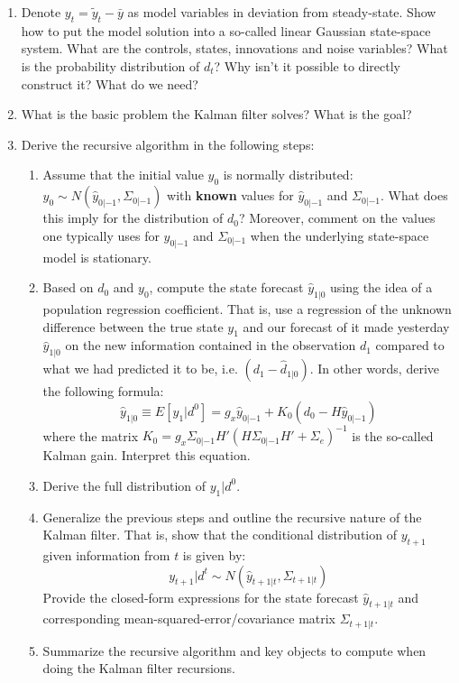 \begin{enumerate}
	\item Denote $y_t = \tilde{y}_t - \bar{y}$ as model variables in deviation from steady-state. Show how to put the model solution into a so-called linear Gaussian state-space system. What are the controls, states, innovations and noise variables? What is the probability distribution of $d_t$? Why isn't it possible to directly construct it? What do we need?
	\item What is the basic problem the Kalman filter solves? What is the goal?
	\item Derive the recursive algorithm in the following steps:
	\begin{enumerate}
		\item Assume that the initial value $y_0$ is normally distributed: $y_0 \sim N(\hat{y}_{0|-1},\Sigma_{0|-1})$ with \textbf{known} values for $\hat{y}_{0|-1}$ and $\Sigma_{0|-1}$. What does this imply for the distribution of $d_0$? Moreover, comment on the values one typically uses for $\hat{y}_{0|-1}$ and $\Sigma_{0|-1}$ when the underlying state-space model is stationary.
		\item Based on $d_0$ and $y_0$, compute the state forecast $\hat{y}_{1|0}$ using the idea of a population regression coefficient. That is, use a regression of the unknown difference between the true state $y_1$ and our forecast of it made yesterday $\hat{y}_{1|0}$ on the new information contained in the observation $d_1$ compared to what we had predicted it to be, i.e. $(d_1 - \hat{d}_{1|0})$. In other words, derive the following formula:
		$$\hat{y}_{1|0} \equiv E[y_1|d^0] = g_x \hat{y}_{0|-1} + K_0\left(d_0-H\hat{y}_{0|-1}\right)$$
	    where the matrix $K_0 = g_x \Sigma_{0|-1} H'(H\Sigma_{0|-1}H' + \Sigma_e)^{-1}$ is the so-called Kalman gain. Interpret this equation.
		\item Derive the full distribution of $y_1|d^0$.
		\item Generalize the previous steps and outline the recursive nature of the Kalman filter. That is, show that the conditional distribution of $y_{t+1}$ given information from $t$ is given by:
		$$y_{t+1}|d^t \sim N(\hat{y}_{t+1|t},\Sigma_{t+1|t})$$
		Provide the closed-form expressions for the state forecast $\hat{y}_{t+1|t}$ and corresponding mean-squared-error/covariance matrix $\Sigma_{t+1|t}$.
		\item Summarize the recursive algorithm and key objects to compute when doing the Kalman filter recursions.
	\end{enumerate}

\end{enumerate}
